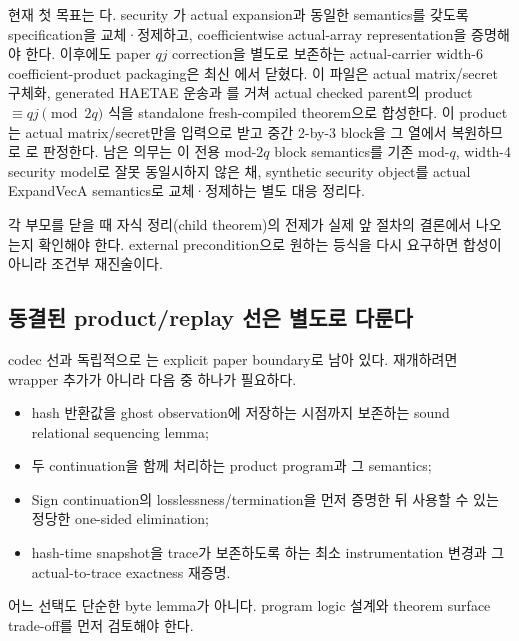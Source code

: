 현재 첫 목표는 다. security
가 actual expansion과 동일한 semantics를
갖도록 specification을 교체·정제하고, coefficientwise actual-array
representation을 증명해야 한다. 이후에도 paper \(qj\) correction을 별도로
보존하는 actual-carrier width-6 coefficient-product packaging은 최신
에서 닫혔다. 이 파일은 actual
matrix/secret 구체화, generated HAETAE  운송과
를 거쳐 actual checked parent의
product \(\equiv qj\pmod{2q}\) 식을 standalone fresh-compiled theorem으로
합성한다. 이 product는 actual matrix/secret만을 입력으로 받고 중간
2-by-3 block을 그 열에서 복원하므로 \FaithfulAugmentedVerdict 로 판정한다.
남은 의무는 이 전용 mod-\(2q\) block semantics를 기존 mod-\(q\), width-4
security model로 잘못 동일시하지 않은 채, synthetic security object를 actual
ExpandVecA semantics로 교체·정제하는 별도 대응 정리다.

각 부모를 닫을 때 자식
정리(child theorem)의 전제가 실제 앞 절차의 결론에서 나오는지 확인해야 한다.
external precondition으로 원하는 등식을 다시 요구하면 합성이 아니라 조건부
재진술이다.

\subsection{동결된 product/replay 선은 별도로 다룬다}

codec 선과 독립적으로 는 explicit paper
boundary로 남아 있다. 재개하려면 wrapper 추가가 아니라 다음 중 하나가 필요하다.

\begin{itemize}
  \item hash 반환값을 ghost observation에 저장하는 시점까지 보존하는 sound
        relational sequencing lemma;
  \item 두 continuation을 함께 처리하는 product program과 그 semantics;
  \item Sign continuation의 losslessness/termination을 먼저 증명한 뒤 사용할 수
        있는 정당한 one-sided elimination;
  \item hash-time snapshot을 trace가 보존하도록 하는 최소 instrumentation 변경과
        그 actual-to-trace exactness 재증명.
\end{itemize}

어느 선택도 단순한 byte lemma가 아니다. program logic 설계와 theorem surface
trade-off를 먼저 검토해야 한다.

